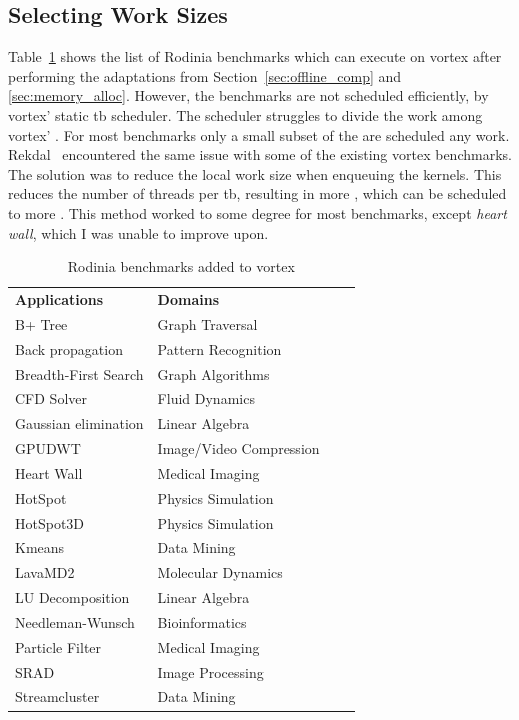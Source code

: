 \subsection{Selecting Work Sizes}

Table~\ref{tab:new_benchmarks} shows the list of Rodinia benchmarks which can execute on \Gls{vortex} after performing the adaptations from Section~\ref{sec:offline_comp} and \ref{sec:memory_alloc}. However, the benchmarks are not scheduled efficiently, by \Gls{vortex}' static \acrshort{tb} scheduler. The scheduler struggles to divide the work among \Gls{vortex}' . For most benchmarks only a small subset of the  are scheduled any work. Rekdal~\cite{Rekdal_Master} encountered the same issue with some of the existing \Gls{vortex} benchmarks. The solution was to reduce the local work size when enqueuing the kernels. This reduces the number of threads per \acrshort{tb}, resulting in more , which can be scheduled to more . This method worked to some degree for most benchmarks, except \textit{heart wall}, which I was unable to improve upon.  

\begin{table}
    \centering
    \caption{Rodinia benchmarks added to \Gls{vortex}}
    \begin{tabular}{|l|l|l|l|} 
        \hline
        \textbf{Applications}      & \textbf{Domains} \\ \hhline{|=|=|}
        B+ Tree                    & Graph Traversal \\ \hline
        Back propagation           & Pattern Recognition \\ \hline
        Breadth-First Search       & Graph Algorithms  \\ \hline
        CFD Solver                 & Fluid Dynamics  \\ \hline
        Gaussian elimination       & Linear Algebra \\ \hline
        GPUDWT                     & Image/Video Compression  \\ \hline
        Heart Wall                 & Medical Imaging \\ \hline
        HotSpot                    & Physics Simulation  \\ \hline
        HotSpot3D                  & Physics Simulation  \\ \hline
        Kmeans                     & Data Mining \\ \hline
        LavaMD2                    & Molecular Dynamics\\ \hline
        LU Decomposition           & Linear Algebra  \\ \hline
        Needleman-Wunsch           & Bioinformatics\\ \hline
        Particle Filter            & Medical Imaging \\ \hline
        SRAD                       & Image Processing  \\ \hline
        Streamcluster              & Data Mining \\ \hline
    \end{tabular}
    \label{tab:new_benchmarks}
\end{table}

